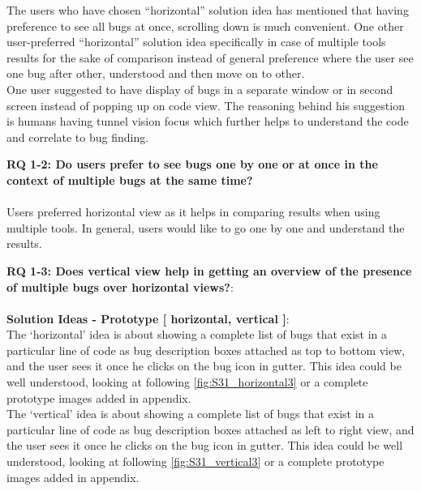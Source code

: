 The users who have chosen “horizontal” solution idea has mentioned that having preference to see all bugs at once, scrolling down is much convenient. One other user-preferred “horizontal” solution idea specifically in case of multiple tools results for the sake of comparison instead of general preference where the user see one bug after other, understood and then move on to other. \\

One user suggested to have display of bugs in a separate window or in second screen instead of popping up on code view. The reasoning behind his suggestion is humans having tunnel vision focus which further helps to understand the code and correlate to bug finding. \\


\begin{myboxi}{{\textbf{RQ 1-2: Do users prefer to see bugs one by one or at once in the context of multiple bugs at the same time?}}}
	\\ \\ Users preferred horizontal view as it helps in comparing results when using multiple tools. In general, users would like to go one by one and understand the results. \\
\end{myboxi}

\clearpage

\textbf{RQ 1-3: Does vertical view help in getting an overview of the presence of multiple bugs over horizontal views?}: \\ \\

\textbf{Solution Ideas - Prototype [ horizontal, vertical ]}: \\

The ‘horizontal’ idea is about showing a complete list of bugs that exist in a particular line of code as bug description boxes attached as top to bottom view, and the user sees it once he clicks on the bug icon in gutter. This idea could be well understood, looking at following \autoref{fig:S31_horizontal3} or a complete prototype images added in appendix. \\

The ‘vertical’ idea is about showing a complete list of bugs that exist in a particular line of code as bug description boxes attached as left to right view, and the user sees it once he clicks on the bug icon in gutter. This idea could be well understood, looking at following \autoref{fig:S31_vertical3} or a complete prototype images added in appendix. \\


